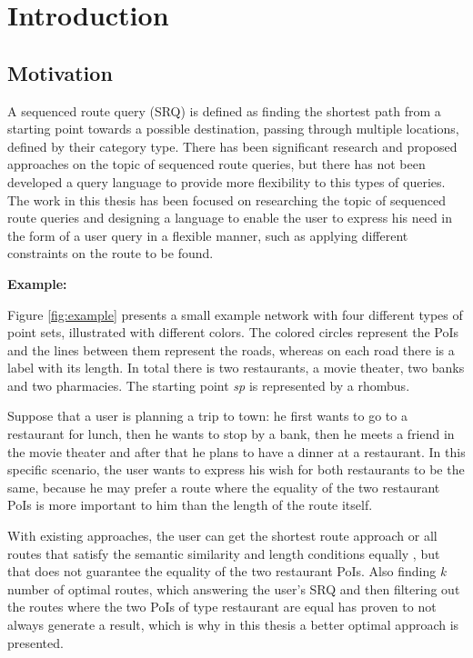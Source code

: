 \chapter{Introduction}
\label{sec:intro}

\section{Motivation}
\label{sec:motivation}
A sequenced route query (SRQ) is defined as finding the shortest path from a starting point towards a possible destination, passing through multiple locations, defined by their category type. There has been significant research and proposed approaches on the topic of sequenced route queries, but there has not been developed a query language to provide more flexibility to this types of queries. The work in this thesis has been focused on researching the topic of sequenced route queries and designing a language to enable the user to express his need in the form of a user query in a flexible manner, such as applying different constraints on the route to be found.

\textbf{Example:}

Figure \ref{fig:example} presents a small example network with four different types of point sets, illustrated with different colors. The colored circles represent the PoIs and the lines between them represent the roads, whereas on each road there is a label with its length. In total there is two restaurants, a movie theater, two banks and two pharmacies. The starting point \textit{sp} is represented by a rhombus.

Suppose that a user is planning a trip to town: he first wants to go to a restaurant for lunch, then he wants to stop by a bank, then he meets a friend in the movie theater and after that he plans to have a dinner at a restaurant. In this specific scenario, the user wants to express his wish for both restaurants to be the same, because he may prefer a route where the equality of the two restaurant PoIs is more important to him than the length of the route itself.

With existing approaches, the user can get the shortest route \cite{OSR} approach or all routes that satisfy the semantic similarity and length conditions equally \cite{semanticSRQ}, but that does not guarantee the equality of the two restaurant PoIs. Also finding \textit{k} number of optimal routes, which answering the user's SRQ and then filtering out the routes where the two PoIs of type restaurant are equal has proven to not always generate a result, which is why in this thesis a better optimal approach is presented.

